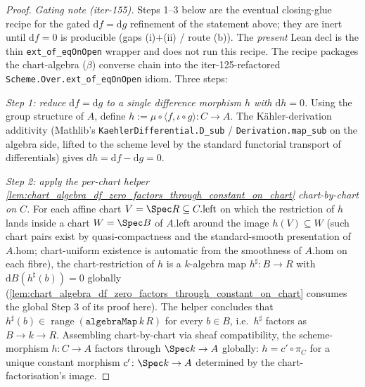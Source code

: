 \begin{proof}
  
  \leanok
  \emph{Gating note (iter-155).} Steps 1--3 below are the eventual closing-glue recipe for the gated \(\mathrm df = \mathrm dg\) refinement of the statement above; they are inert until \(\mathrm df = 0\) is producible (gaps (i)\(+\)(ii) / route (b)). The \emph{present} Lean decl is the thin \texttt{ext\_of\_eqOnOpen} wrapper and does not run this recipe. The recipe packages the chart-algebra (\(\beta\)) converse chain into the iter-125-refactored \texttt{Scheme.Over.ext\_of\_eqOnOpen} idiom. Three steps:

  \emph{Step 1: reduce \(\mathrm df = \mathrm dg\) to a single difference morphism \(h\) with \(\mathrm dh = 0\).} Using the group structure of \(A\), define \(h := \mu \circ \langle f, \iota \circ g \rangle \colon C \to A\). The K\"ahler-derivation additivity (Mathlib's \texttt{KaehlerDifferential.D\_sub} / \texttt{Derivation.map\_sub} on the algebra side, lifted to the scheme level by the standard functorial transport of differentials) gives \(\mathrm dh = \mathrm df - \mathrm dg = 0\).

  \emph{Step 2: apply the per-chart helper \cref{lem:chart_algebra_df_zero_factors_through_constant_on_chart} chart-by-chart on \(C\).} For each affine chart \(V = \Spec R \subseteq C.\mathrm{left}\) on which the restriction of \(h\) lands inside a chart \(W = \Spec B\) of \(A.\mathrm{left}\) around the image \(h(V) \subseteq W\) (such chart pairs exist by quasi-compactness and the standard-smooth presentation of \(A.\mathrm{hom}\); chart-uniform existence is automatic from the smoothness of \(A.\mathrm{hom}\) on each fibre), the chart-restriction of \(h\) is a \(k\)-algebra map \(h^{\sharp} \colon B \to R\) with \(\mathrm dB(h^{\sharp}(b)) = 0\) globally (\cref{lem:chart_algebra_df_zero_factors_through_constant_on_chart} consumes the global Step 3 of its proof here). The helper concludes that \(h^{\sharp}(b) \in \operatorname{range}(\mathtt{algebraMap}\,k\,R)\) for every \(b \in B\), i.e.\ \(h^{\sharp}\) factors as \(B \to k \to R\). Assembling chart-by-chart via sheaf compatibility, the scheme-morphism \(h \colon C \to A\) factors through \(\Spec k \to A\) globally: \(h = c' \circ \pi_C\) for a unique constant morphism \(c' \colon \Spec k \to A\) determined by the chart-factorisation's image.


\end{proof}
